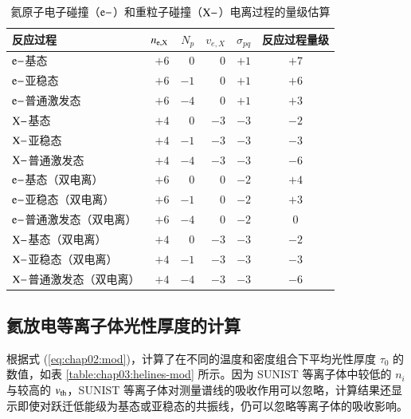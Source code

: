 \begin{table}%
\caption{氦原子电子碰撞（${\rm e-}$）和重粒子碰撞（${\rm X-}$）电离过程的量级估算}
\label{table:chap03:ion-process-gusuan}
\begin{center}
\begin{tabular}{lrrrrc}\toprule[1.5pt]
反应过程 & $n_{\rm e,X}$ & $N_{p}$ & $v_{e,X}$ & $\sigma_{pq}$ & 反应过程量级\\
\midrule[1pt]
${\rm e-}$基态       & $+6$ & $0$  & $0$  & $+1$ & $+7$ \\
${\rm e-}$亚稳态     & $+6$ & $-1$ & $0$  & $+1$ & $+6$ \\
${\rm e-}$普通激发态 & $+6$ & $-4$ & $0$  & $+1$ & $+3$ \\
${\rm X-}$基态       & $+4$ & $0$  & $-3$ & $-3$ & $-2$ \\
${\rm X-}$亚稳态     & $+4$ & $-1$ & $-3$ & $-3$ & $-3$ \\
${\rm X-}$普通激发态 & $+4$ & $-4$ & $-3$ & $-3$ & $-6$ \\
${\rm e-}$基态（双电离）       & $+6$ & $0$  & $0$  & $-2$  & $+4$ \\
${\rm e-}$亚稳态（双电离）     & $+6$ & $-1$ & $0$  & $-2$  & $+3$ \\
${\rm e-}$普通激发态（双电离） & $+6$ & $-4$ & $0$  & $-2$  & \hspace{0.8em}$0$ \\
${\rm X-}$基态（双电离）       & $+4$ & $0$  & $-3$ & $-3$ & $-2$ \\
${\rm X-}$亚稳态（双电离）     & $+4$ & $-1$ & $-3$ & $-3$ & $-3$ \\
${\rm X-}$普通激发态（双电离） & $+4$ & $-4$ & $-3$ & $-3$ & $-6$ \\
\bottomrule[1.5pt]
\end{tabular}
\end{center}
\end{table}

\subsection{氦放电等离子体光性厚度的计算}

根据式 (\ref{eq:chap02:mod})，计算了在不同的温度和密度组合下平均光性厚度 $\tau_0$ 的数值，如表 \ref{table:chap03:helines-mod} 所示。因为 SUNIST 等离子体中较低的 $n_i$ 与较高的 $v_{\rm th}$，SUNIST 等离子体对测量谱线的吸收作用可以忽略，计算结果还显示即使对跃迁低能级为基态或亚稳态的共振线，仍可以忽略等离子体的吸收影响。

